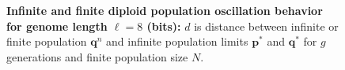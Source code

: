 \begin{figure}[H]
\begin{center}
{}


\caption{\textbf{Infinite and finite diploid population oscillation behavior for genome length $\ell = 8$ (bits):} $d$ is
  distance between infinite or finite population ${\bm q}^n$ and infinite
  population limits ${{\bm p}^\ast}$ and ${{\bm q}^{\ast}}$ for $g$ generations and finite population size $N$.}
\label{oscillation_8}
\end{center}
\end{figure}


